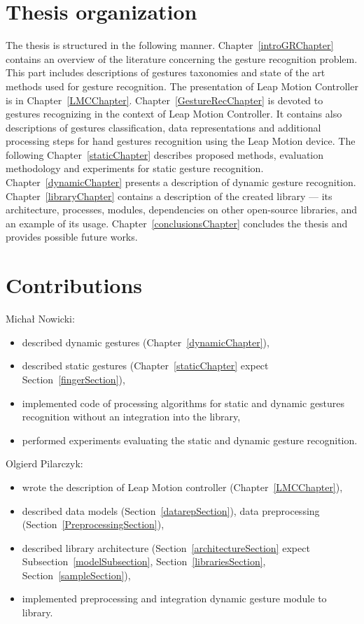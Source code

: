 \section{Thesis organization}
The thesis is structured in the following manner. 
Chapter~\ref{introGRChapter} contains an overview of the literature concerning the gesture recognition problem. 
This part includes descriptions of gestures taxonomies and state of the art methods used for gesture recognition.
The presentation of Leap Motion Controller is in Chapter~\ref{LMCChapter}.
Chapter~\ref{GestureRecChapter} is devoted to gestures recognizing in the context of Leap Motion Controller.
It contains also descriptions of gestures classification, data representations and additional processing steps for hand gestures recognition using the Leap Motion device. 
The following Chapter~\ref{staticChapter} describes proposed methods, evaluation methodology and experiments for static gesture recognition. 
Chapter~\ref{dynamicChapter} presents a description of dynamic gesture recognition. 
Chapter~\ref{libraryChapter} contains a description of the created library --- its architecture, processes, modules, dependencies on other open-source libraries, and an example of its usage. 
Chapter~\ref{conclusionsChapter} concludes the thesis and provides possible future works. 

\section{Contributions}
Michał Nowicki:
\begin {itemize} 
\item described dynamic gestures (Chapter~\ref{dynamicChapter}),
\item described static gestures (Chapter~\ref{staticChapter} expect Section~\ref{fingerSection}), 
\item implemented code of processing algorithms for static and dynamic gestures recognition without an integration into the library,
\item performed experiments evaluating the static and dynamic gesture recognition. 
\end {itemize}

Olgierd Pilarczyk:
\begin{itemize}
\item wrote the description of Leap Motion controller (Chapter~\ref{LMCChapter}),
\item described data models (Section~\ref{datarepSection}), data preprocessing (Section~\ref{PreprocessingSection}),
\item described library architecture (Section~\ref{architectureSection} expect Subsection~\ref{modelSubsection}, Section~\ref{librariesSection}, Section~\ref{sampleSection}),
\item implemented preprocessing and integration dynamic gesture module to library. 
\end {itemize}

